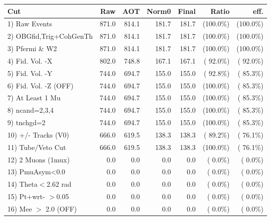  \begin{table}[h!]\centering
 \begin{tabular}{||l||r|r|r|r|r|r||}
 \hline
 \hline
 Cut & Raw & AOT & Norm0 & Final & Ratio & eff.       \\
 \hline
  1) Raw Events           &        871.0 &        814.1 &        181.7 &        181.7 & (100.0\%) & (100.0\%) \\
  2) OBGfid,Trig+CohGenTh &        871.0 &        814.1 &        181.7 &        181.7 & (100.0\%) & (100.0\%) \\
  3) Pfermi \& W2         &        871.0 &        814.1 &        181.7 &        181.7 & (100.0\%) & (100.0\%) \\
  4) Fid. Vol. -X         &        802.0 &        748.8 &        167.1 &        167.1 & ( 92.0\%) & ( 92.0\%) \\
  5) Fid. Vol. -Y         &        744.0 &        694.7 &        155.0 &        155.0 & ( 92.8\%) & ( 85.3\%) \\
  6) Fid. Vol. -Z (OFF)   &        744.0 &        694.7 &        155.0 &        155.0 & (100.0\%) & ( 85.3\%) \\
  7) At Least 1 Mu        &        744.0 &        694.7 &        155.0 &        155.0 & (100.0\%) & ( 85.3\%) \\
  8) ncand=2,3,4          &        744.0 &        694.7 &        155.0 &        155.0 & (100.0\%) & ( 85.3\%) \\
  9) tnchgd=2             &        744.0 &        694.7 &        155.0 &        155.0 & (100.0\%) & ( 85.3\%) \\
 10) +/- Tracks (V0)      &        666.0 &        619.5 &        138.3 &        138.3 & ( 89.2\%) & ( 76.1\%) \\
 11) Tube/Veto Cut        &        666.0 &        619.5 &        138.3 &        138.3 & (100.0\%) & ( 76.1\%) \\
 12) 2 Muons (1mux)       &          0.0 &          0.0 &          0.0 &          0.0 & (  0.0\%) & (  0.0\%) \\
 13) PmuAsym<0.0          &          0.0 &          0.0 &          0.0 &          0.0 & (  0.0\%) & (  0.0\%) \\
 14) Theta$<$2.62 rad     &          0.0 &          0.0 &          0.0 &          0.0 & (  0.0\%) & (  0.0\%) \\
 15) Pt+wrt- $>$0.05      &          0.0 &          0.0 &          0.0 &          0.0 & (  0.0\%) & (  0.0\%) \\
 16) Mee $>$ 2.0  (OFF)   &          0.0 &          0.0 &          0.0 &          0.0 & (  0.0\%) & (  0.0\%) \\

\end{tabular}
\end{table}
